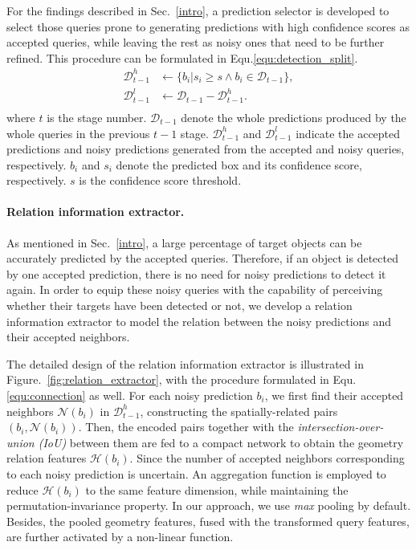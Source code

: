 \documentclass[final]{cvpr}
\begin{document}
For the findings described in Sec.~\ref{intro},  a prediction selector is developed to select those queries prone to generating predictions with high confidence scores as accepted queries, while leaving the rest as noisy ones that need to be further refined. This procedure can be formulated in Equ.\eqref{equ:detection_split}.
\begin{equation}
\begin{split}
    \mathcal{D}^{h}_{t-1} &\gets \{{b_{i}| s_{i} \geq s \wedge b_{i} \in \mathcal{D}_{t-1}} \}, \\
    \mathcal{D}^{l}_{t-1} &\gets \mathcal{D}_{t-1} - \mathcal{D}^{h}_{t-1}. \\
\end{split}\label{equ:detection_split}    
\end{equation}
where $t$ is the stage number. $\mathcal{D}_{t-1}$ denote the whole predictions produced by the whole queries in the previous $t-1$ stage. $\mathcal{D}^h_{t-1}$ and $\mathcal{D}^l_{t-1}$ indicate the accepted predictions and noisy predictions generated from the accepted and noisy queries, respectively. $b_{i}$ and $s_{i}$ denote the predicted box and its confidence score, respectively. $s$ is the confidence score threshold.

\vspace{-0.4cm}
\paragraph{Relation information extractor.} 
As mentioned in Sec.~\ref{intro}, a  large percentage of target objects can be accurately predicted by the accepted queries. Therefore, if an object is detected by one accepted prediction, there is no need for noisy predictions to detect it again. In order to equip these noisy queries with the capability of perceiving whether their targets have been detected or not, we develop a relation information extractor to model the relation between the noisy predictions and their accepted neighbors.

The detailed design of the relation information extractor is illustrated in Figure.~\ref{fig:relation_extractor}, with the procedure formulated in Equ.\eqref{equ:connection} as well. For each noisy prediction $b_i$, we first find their accepted neighbors $\mathcal{N}(b_i)$ in $\mathcal{D}^h_{t-1}$, constructing the spatially-related pairs $(b_i, \mathcal{N}(b_i))$. Then, the encoded pairs together with the \textit{intersection-over-union (IoU)} between them are fed to a compact network to obtain the geometry relation features $\mathcal{H}(b_i)$. Since the number of accepted neighbors corresponding to each noisy prediction is uncertain. An aggregation function is employed to reduce $\mathcal{H}(b_i)$ to the same feature dimension, while maintaining the permutation-invariance property. In our approach, we use \textit{max} pooling by default. Besides, the pooled geometry features, fused with the transformed query features, are further activated by a non-linear function.
\end{document}
